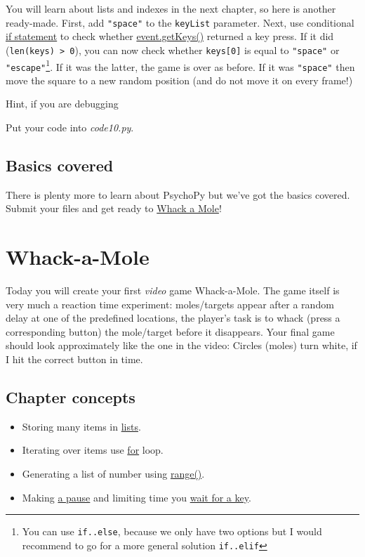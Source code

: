 \documentclass[
]{book}
\providecommand{\tightlist}{%
  \setlength{\itemsep}{0pt}\setlength{\parskip}{0pt}}
\begin{document}
You will learn about lists and indexes in the next chapter, so here is another ready-made. First, add \texttt{"space"} to the \texttt{keyList} parameter. Next, use conditional \protect\hyperlink{ux5cux257Bux5cux23if-statement}{if statement} to check whether \href{https://psychopy.org/api/event.html\#psychopy.event.getKeys}{event.getKeys()} returned a key press. If it did (\texttt{len(keys)\ \textgreater{}\ 0}), you can now check whether \texttt{keys{[}0{]}} is equal to \texttt{"space"} or \texttt{"escape"}\footnote{You can use \texttt{if..else}, because we only have two options but I would recommend to go for a more general solution \texttt{if..elif}}. If it was the latter, the game is over as before. If it was \texttt{"space"} then move the square to a new random position (and do not move it on every frame!)

Hint, if you are debugging

Put your code into \emph{code10.py}.

\hypertarget{basics-covered}{%
\section{Basics covered}\label{basics-covered}}

There is plenty more to learn about PsychoPy but we've got the basics covered. Submit your files and get ready to \protect\hyperlink{whack-a-mole}{Whack a Mole}!

\hypertarget{whack-a-mole}{%
\chapter{Whack-a-Mole}\label{whack-a-mole}}

Today you will create your first \emph{video} game Whack-a-Mole. The game itself is very much a reaction time experiment: moles/targets appear after a random delay at one of the predefined locations, the player's task is to whack (press a corresponding button) the mole/target before it disappears. Your final game should look approximately like the one in the video: Circles (moles) turn white, if I hit the correct button in time.

\hypertarget{chapter-concepts-4}{%
\section{Chapter concepts}\label{chapter-concepts-4}}

\begin{itemize}
\tightlist
\item
  Storing many items in \protect\hyperlink{lists}{lists}.
\item
  Iterating over items use \protect\hyperlink{for-loop}{for} loop.
\item
  Generating a list of number using \protect\hyperlink{range}{range()}.
\item
  Making \protect\hyperlink{clock-wait}{a pause} and limiting time you \protect\hyperlink{waitKeys-maxwait}{wait for a key}.
\end{itemize}
\end{document}
